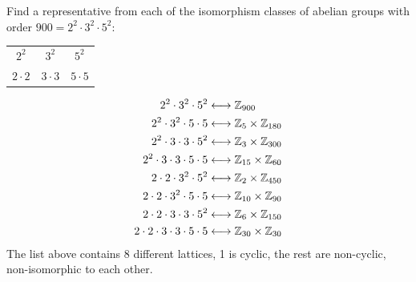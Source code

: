 \begin{example}
Find a representative from each of the isomorphism classes of abelian groups with order $900=2^2\cdot 3^2 \cdot 5^2$:
\begin{table}[h!]
    \centering
    \begin{tabular}{c|c|c} \hline
         $2^2$& $3^2$& $5^2$   \\ 
         $2\cdot 2$& $3\cdot 3$& $5\cdot 5$ 
    \end{tabular}
\end{table}
\begin{align}
    2^2\cdot 3^2 \cdot 5^2 &\longleftrightarrow {\mathbb{ Z}}_{900} \nonumber \\
    2^2 \cdot 3^2 \cdot 5\cdot 5 &\longleftrightarrow {\mathbb{ Z}}_5\times {\mathbb{ Z}}_{180} \nonumber \\
    2^2 \cdot 3\cdot 3 \cdot 5^2 &\longleftrightarrow {\mathbb{ Z}}_3 \times {\mathbb{ Z}}_{300} \nonumber \\
    2^2 \cdot 3\cdot 3 \cdot 5 \cdot 5 &\longleftrightarrow {\mathbb{ Z}}_{15} \times {\mathbb{ Z}}_{60} \nonumber \\
    2\cdot 2 \cdot 3^2 \cdot 5^2 &\longleftrightarrow {\mathbb{ Z}}_2\times {\mathbb{ Z}}_{450} \nonumber \\
    2\cdot 2 \cdot 3^2 \cdot 5 \cdot 5  &\longleftrightarrow {\mathbb{ Z}}_{10}\times {\mathbb{ Z}}_{90} \nonumber \\
    2\cdot 2 \cdot 3 \cdot 3 \cdot 5^2 &\longleftrightarrow {\mathbb{ Z}}_{6}\times {\mathbb{ Z}}_{150} \nonumber \\
    2\cdot 2\cdot 3\cdot 3 \cdot 5 \cdot 5 &\longleftrightarrow {\mathbb{ Z}}_{30}\times {\mathbb{ Z}}_{30} \nonumber
\end{align}
The list above contains 8 different lattices, 1 is cyclic, the rest are non-cyclic, non-isomorphic to each other.
\end{example}
